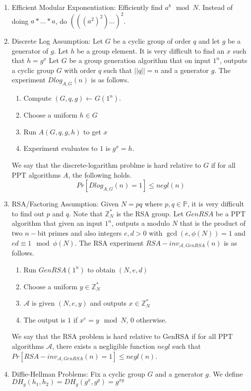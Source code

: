 \documentclass[12pt,letterpaper]{article}
\begin{document}
\begin{enumerate}
		\item Efficient Modular Exponentiation: Efficiently find $a^b\mod N$. Instead of doing $a*\ldots*a$, do $(((a^2)^2)\ldots)^2$.
		\item Discrete Log Assumption: Let $G$ be a cyclic group of order $q$ and let $g$ be a generator of $g$. Let $h$ be a group element. It is very difficult to find an $x$ such that $h=g^x$\bigskip\newline
		Let $G$ be a group generation algorithm that on input $1^n$, outputs a cyclic group $G$ with order $q$ such that $||q||=n$ and a generator $g$. The experiment $Dlog_{A,G}(n)$ is as follows.
		\begin{enumerate}
			\item Compute $(G,q,g)\leftarrow G(1^n)$.
			\item Choose a uniform $h\in G$
			\item Run $A(G,q,g,h)$ to get $x$
			\item Experiment evaluates to $1$ is $g^x=h$.
		\end{enumerate}
		We say that the discrete-logarithm problme is hard relative to $G$ if for all PPT algorithms $A$, the following holds.
		\[Pr[Dlog_{A,G}(n)=1]\leq negl(n)\]
		\newpage
		\item RSA/Factoring Assumption: Given $N=pq$ where $p,q\in\mathbb{P}$, it is very difficult to find out $p$ and $q$. Note that $\mathbb{Z}_N^*$ is the RSA group.\bigskip\newline
		Let $GenRSA$ be a PPT algorithm that given an input $1^n$, outputs a modulo $N$ that is the product of two $n-$bit primes and also integers $e,d>0$ with $\gcd(e,\phi(N))=1$ and $ed\equiv 1\mod\phi(N)$. The RSA experiment $RSA-inv_{\mathcal{A},GenRSA}(n)$ is as follows.
            \begin{enumerate}
                \item Run $GenRSA(1^n)$ to obtain $(N,e,d)$
                \item Choose a uniform $y\in\mathbb{Z}_N^*$
                \item $\mathcal{A}$ is given $(N,e,y)$ and outputs $x\in\mathbb{Z}_N^*$
                \item The output is $1$ if $x^e=y\mod N$, 0 otherwise.
            \end{enumerate}
            We say that the RSA problem is hard relative to GenRSA if for all PPT algorithms $\mathcal{A}$, there exists a negligible function $negl$ such that $Pr[RSA-inv_{\mathcal{A},GenRSA}(n)=1]\leq negl(n)$.
    	\item Diffie-Hellman Problems: Fix a cyclic group $G$ and a generator $g$. We define $DH_g(h_1,h_2)=DH_g(g^x,g^y)=g^{xy}$

\end{enumerate}
\end{document}
